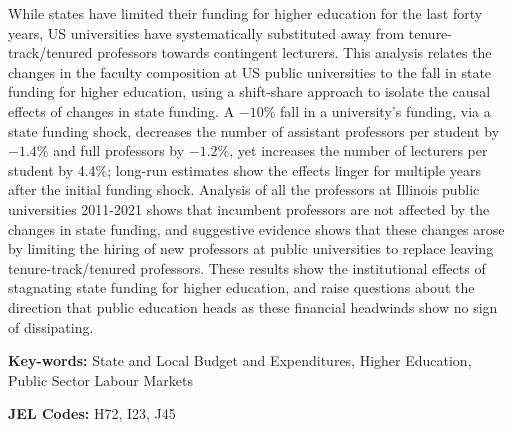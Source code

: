 While states have limited their funding for higher education for the last forty years, US universities have systematically substituted away from tenure-track/tenured professors towards contingent lecturers.
This analysis relates the changes in the faculty composition at US public universities to the fall in state funding for higher education, using a shift-share approach to isolate the causal effects of changes in state funding.
A $-10$\% fall in a university's funding, via a state funding shock, decreases the number of assistant professors per student by $-1.4$\% and full professors by $-1.2$\%, yet increases the number of lecturers per student by 4.4\%; long-run estimates show the effects linger for multiple years after the initial funding shock.
Analysis of all the professors at Illinois public universities 2011-2021 shows that incumbent professors are not affected by the changes in state funding, and suggestive evidence shows that these changes arose by limiting the hiring of new professors at public universities to replace leaving tenure-track/tenured professors.
These results show the institutional effects of stagnating state funding for higher education, and raise questions about the direction that public education heads as these financial headwinds show no sign of dissipating.

\vfill
\noindent
\textbf{Key-words:}
State and Local Budget and Expenditures,
Higher Education,
Public Sector Labour Markets

\vspace{0.1cm}
\noindent
\textbf{JEL Codes:} H72, I23, J45
